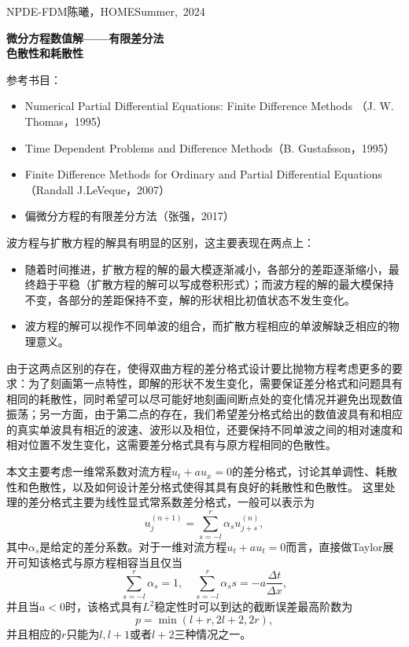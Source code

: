 \documentclass[a4paper,10pt]{ctexart}
\begin{document}
\hfill\vbox{\hbox{NPDE-FDM}\hbox{陈曦，HOME}\hbox{Summer, 2024}}

\begin{center}\Large
    \textbf{微分方程数值解——有限差分法}\\{\normalsize\bf {色散性和耗散性}}
\end{center}
\vskip 30pt
\small {参考书目：
\begin{itemize}
    \item Numerical Partial Differential Equations: Finite Difference Methods （J. W. Thomas，1995）
    \item Time Dependent Problems and Difference Methods（B. Gustafsson，1995）
    \item Finite Difference Methods for Ordinary and Partial Differential Equations（Randall J.LeVeque，2007）
    \item 偏微分方程的有限差分方法（张强，2017）
\end{itemize}}
波方程与扩散方程的解具有明显的区别，这主要表现在两点上：
\begin{itemize}
    \item 随着时间推进，扩散方程的解的最大模逐渐减小，各部分的差距逐渐缩小，最终趋于平稳（扩散方程的解可以写成卷积形式）；而波方程的解的最大模保持不变，各部分的差距保持不变，解的形状相比初值状态不发生变化。
    \item 波方程的解可以视作不同单波的组合，而扩散方程相应的单波解缺乏相应的物理意义。
\end{itemize}
由于这两点区别的存在，使得双曲方程的差分格式设计要比抛物方程考虑更多的要求：为了刻画第一点特性，即解的形状不发生变化，需要保证差分格式和问题具有相同的耗散性，同时希望可以尽可能好地刻画间断点处的变化情况并避免出现数值振荡；另一方面，由于第二点的存在，我们希望差分格式给出的数值波具有和相应的真实单波具有相近的波速、波形以及相位，还要保持不同单波之间的相对速度和相对位置不发生变化，这需要差分格式具有与原方程相同的色散性。

本文主要考虑一维常系数对流方程$ u_t+au_x=0 $的差分格式，讨论其单调性、耗散性和色散性，以及如何设计差分格式使得其具有良好的耗散性和色散性。
这里处理的差分格式主要为线性显式常系数差分格式，一般可以表示为
\begin{equation}\label{eq:explict}
    u^{(n+1)}_j = \sum_{s=-l}^r \alpha_s u^{(n)}_{j+s},
\end{equation}
其中$ \alpha_s $是给定的差分系数。对于一维对流方程$ u_t+au_t=0 $而言，直接做Taylor展开可知该格式与原方程相容当且仅当
\begin{equation}
    \sum_{s=-l}^r \alpha_s = 1, \quad \sum_{s=-l}^r \alpha_s s = -a \frac{\Delta t}{\Delta x},
\end{equation}
并且当$ a<0 $时，该格式具有$ L^2 $稳定性时可以到达的截断误差最高阶数为
\begin{equation}
    p = \min(l+r,2l+2,2r),
\end{equation}
并且相应的$ r $只能为$ l,l+1 $或者$ l+2 $三种情况之一。
\end{document}
